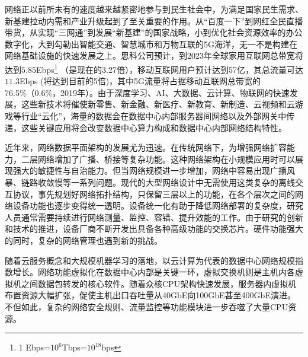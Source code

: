 
\label{chap1}


\label{chap11}


网络正以前所未有的速度越来越紧密地参与到民生社会中，为满足国家民生需求、新基建拉动内需和产业升级起到了至关重要的作用。从“百度一下”到网红全民直播带货，从实现“三网通”到发展“新基建”的国家战略，小到优化社会资源效率的办公数字化，大到勾勒出智能交通、智慧城市和万物互联的5G海洋，无一不是构建在网络基础设施的快速发展之上。思科公司预计，到2023年全球家用互联网总带宽将达到$5.85$Ebps\footnote{1 Ebps=$10^6$Tbps=$10^{18}$bps} （是现在的3.27倍），移动互联网用户预计达到57亿，其总流量可达$11.3$Ebps (将达到目前的5倍)，其中5G流量将占据移动互联网总带宽的76.5\%（0.6\%，2019年）。由于深度学习、AI、大数据、云计算、物联网的快速发展，这些新技术将催使新零售、新金融、新医疗、新教育、新制造、云视频和云游戏等行业“云化”，海量的数据会在数据中心内部服务器间网络以及外部网关中传递，这些关键应用将会改变数据中心算力构成和数据中心内部网络结构特性。



近年来，网络数据平面架构的发展尤为迅速。在传统网络下，为增强网络扩容能力，二层网络增加了广播、桥接等复杂功能。这种网络架构在小规模应用时可以展现强大的敏捷性与自治能力。但当网络规模进一步增加，网络中容易出现广播风暴、链路收敛慢等一系列问题。现代的大型网络设计中无需使用这类复杂的离线交互协议，事先规划好网络拓扑结构，只保留三层以上的功能，在各个层次之间的网络设备功能也逐步变得统一透明。设备统一化有助于降低网络部署的复杂度，研究人员通常需要持续进行网络测量、监控、容错、提升效能的工作。由于研究的创新和技术的推进，设备厂商不断开发出具备各种高级功能的交换芯片。硬件功能强大的同时，复杂的网络管理也遇到新的挑战。

随着云服务概念和大规模机器学习的落地，以云计算为代表的数据中心网络规模指数增长。网络功能虚拟化在数据中心内部是关键一环，虚拟交换机则是主机内各虚拟机之间数据包转发的核心软件。随着众核CPU架构快速发展，服务器内虚拟机布置资源大幅扩张，促使主机出口吞吐量从40GbE向100GbE甚至400GbE演进。不但如此，复杂的网络安全规则、流量监控等功能模块进一步吞噬了大量CPU资源。

